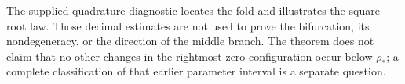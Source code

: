 The supplied quadrature diagnostic locates the fold and illustrates the
square-root law. Those decimal estimates are not used to prove the
bifurcation, its nondegeneracy, or the direction of the middle branch.
The theorem does not claim that no other changes in the rightmost
zero configuration occur below $\rho_*$; a complete classification of
that earlier parameter interval is a separate question.
